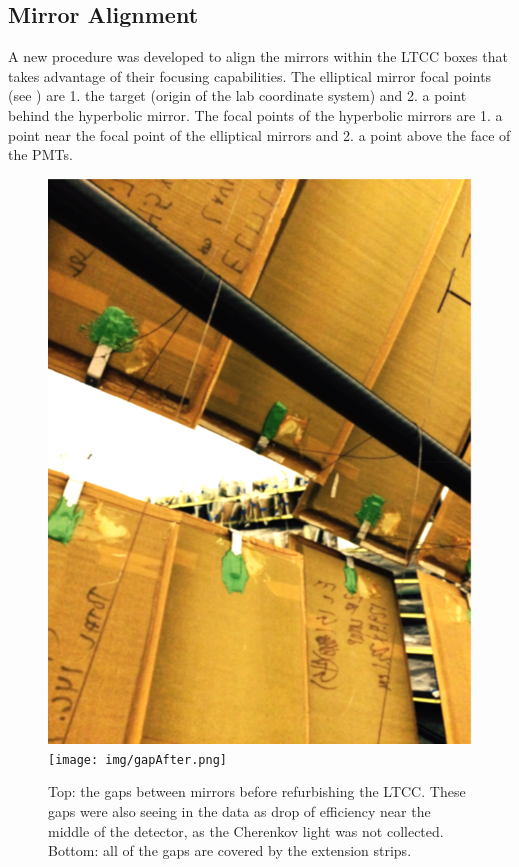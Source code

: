 \subsection{Mirror Alignment}
\label{sec:mirrorAlignment}

A new procedure was developed to align the mirrors within the LTCC boxes that takes advantage of their focusing
capabilities. The elliptical mirror focal points (see ) are 1. the target (origin of the lab
coordinate system) and 2. a point behind the hyperbolic mirror. The focal points of the hyperbolic mirrors are 1. a
point near the focal point of the elliptical mirrors and 2. a point above the face of the PMTs.

\begin{figure}[ht]
\centering
	\includegraphics[width=0.98\columnwidth, height=0.7\columnwidth]{img/gapBefore.png}
	\texttt{[image: img/gapAfter.png]}
	\caption{Top: the gaps between mirrors before refurbishing the LTCC. These gaps were also seeing in the data
          as drop of efficiency near the middle of the detector, as the Cherenkov light was not collected. Bottom: all of
          the gaps are covered by the extension strips.}
	\label{fig:gapBeforeAndAfter}
\end{figure}

